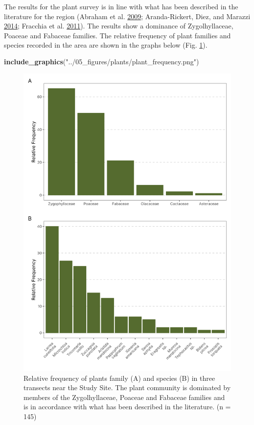 \documentclass[msc,numbers,hidelinks]{coppe}
\newenvironment{Shaded}{\begin{snugshade}}{\end{snugshade}}
\newcommand{\KeywordTok}[1]{\textcolor[rgb]{0.13,0.29,0.53}{\textbf{#1}}}
\newcommand{\NormalTok}[1]{#1}
\newcommand{\StringTok}[1]{\textcolor[rgb]{0.31,0.60,0.02}{#1}}
\begin{document}
  The results for the plant survey is in line with what has been described in the literature for the region (Abraham et al. \protect\hyperlink{ref-abrahamOverviewGeographyMonte2009}{2009}; Aranda-Rickert, Diez, and Marazzi \protect\hyperlink{ref-aranda-rickertExtrafloralNectarFuels2014}{2014}; Fracchia et al. \protect\hyperlink{ref-fracchiaDispersalArbuscularMycorrhizal2011}{2011}). The results show a dominance of Zygolhyllaceae, Poaceae and Fabaceae families. The relative frequency of plant families and species recorded in the area are shown in the graphs below (Fig. \ref{fig:appendix-plants}).
\begin{Shaded}
\begin{Highlighting}[]
\KeywordTok{include\_graphics}\NormalTok{(}\StringTok{"../05\_figures/plants/plant\_frequency.png"}\NormalTok{)}
\end{Highlighting}
\end{Shaded}
  \begin{figure}
  \includegraphics[width=1\linewidth]{../05_figures/plants/plant_frequency} \caption{Relative frequency of plants family (A) and species (B) in three transects near the Study Site. The plant community is dominated by members of the Zygolhyllaceae, Poaceae and Fabaceae families and is in accordance with what has been described in the literature. (n = 145)}\label{fig:appendix-plants}
  \end{figure}
\end{document}
